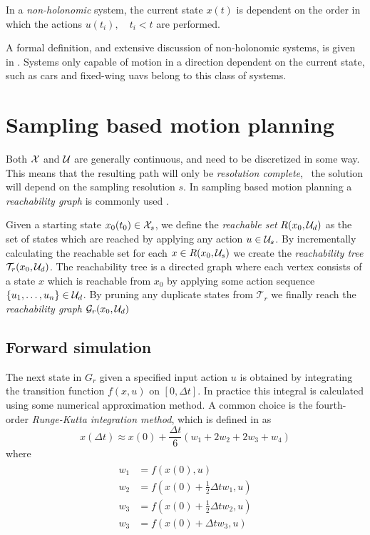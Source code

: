 \begin{definition}
    In a \textit{non-holonomic} system, the current state $x(t)$ is dependent 
    on the order in which the actions $u(t_i),\quad t_i<t$ are performed.
\end{definition}

A formal definition, and extensive discussion of non-holonomic systems, is given 
in \cite[Chapter~15]{planning_algorithms}. Systems only capable of motion in a direction 
dependent on the current state, such as cars and fixed-wing \acp{uav} belong to this class of systems.

\section{Sampling based motion planning}
Both $\mathcal{X}$ and $\mathcal{U}$ are generally continuous, and need to be discretized 
in some way. This means that the resulting path will only be \textit{resolution complete}, \ie\  
the solution will depend on the sampling resolution $s$. In sampling based
motion planning a \textit{reachability graph} is commonly used \cite{planning_algorithms}.

\begin{definition}\label{def:reach_graph}
    Given a starting state $x_0(t_0)\in\mathcal{X}_s$, we define the \textit{reachable set} 
    $R(x_0, \mathcal{U}_d)$ as the set of states which are reached by applying any action $u\in\mathcal{U}_s$.
    By incrementally calculating the reachable set for each $x\in R(x_0, \mathcal{U}_s)$ we create the \textit{reachability tree} $\mathcal{T}_r(x_0, \mathcal{U}_d)$.
    The reachability tree is a directed graph where each vertex consists of a state $x$ which is reachable from $x_0$ by applying some action sequence 
    $\{u_1,\hdots,u_n\}\in\mathcal{U}_d$. By pruning any duplicate states from $\mathcal{T}_r$ we finally reach the \textit{reachability graph} $\mathcal{G}_r(x_0, \mathcal{U}_d)$
\end{definition}

\subsection{Forward simulation}
The next state in $G_r$ given a specified input action $u$ is obtained by 
integrating the transition function $f(x, u)$ on $[0, \Delta t]$. In practice this 
integral is calculated using some numerical approximation method. A common choice is the 
fourth-order \textit{Runge-Kutta integration method}, which is defined in \cite{planning_algorithms} as
\begin{equation}
    x(\Delta t)\approx x(0) + \frac{\Delta t}{6}(w_1 + 2w_2 + 2w_3 + w_4)
\end{equation}
where
\begin{align}
\begin{split}
    w_1 &= f(x(0), u) \\
    w_2 &= f(x(0) + \frac{1}{2}\Delta t w_1, u) \\
    w_3 &= f(x(0) + \frac{1}{2}\Delta t w_2, u) \\
    w_3 &= f(x(0) + \Delta t w_3, u)
\end{split}
\end{align}

